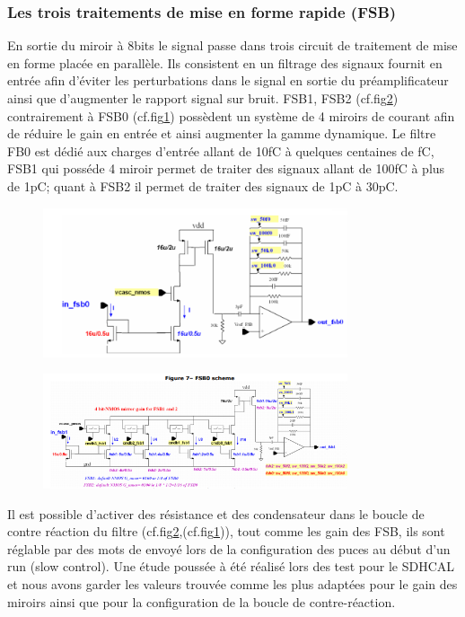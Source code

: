 \subsubsection{Les trois traitements de mise en forme rapide (FSB)}
En sortie du miroir à 8bits le signal passe dans trois circuit de traitement de mise en forme placée en parallèle. Ils consistent en un filtrage des signaux fournit en entrée afin d'éviter les perturbations dans le signal en sortie du préamplificateur ainsi que d'augmenter le rapport signal sur bruit. FSB1, FSB2 (cf.fig\ref{fsb1}) contrairement à FSB0 (cf.fig\ref{fsb0}) possèdent un système de 4 miroirs de courant afin de réduire le gain en entrée et ainsi augmenter la gamme dynamique. Le filtre FB0 est dédié aux charges d'entrée allant de 10fC à quelques centaines de fC, FSB1 qui posséde 4 miroir permet de traiter des signaux allant de 100fC à plus de 1pC; quant à FSB2 il permet de traiter des signaux de 1pC à 30pC.
\begin{figure}[ht!]
	\centering
	\includegraphics[width=0.8\textwidth]{GLA/FSB0.png}
	\label{fsb0}
\end{figure}
\begin{figure}[ht!]
	\centering
	\includegraphics[width=0.8\textwidth]{GLA/FSB1.png}
	\label{fsb1}
\end{figure}
Il est possible d'activer des résistance et des condensateur dans le boucle de contre réaction du filtre (cf.fig\ref{fsb1},(cf.fig\ref{fsb0})), tout comme les gain des FSB, ils sont réglable par des mots de envoyé lors de la configuration des puces au début d'un run (slow control). Une étude poussée à été réalisé lors des test pour le SDHCAL et nous avons garder les valeurs trouvée comme les plus adaptées pour le gain des miroirs ainsi que pour la configuration de la boucle de contre-réaction.

